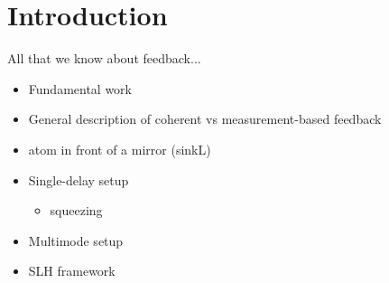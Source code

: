 \documentclass[%
 reprint,
 amsmath,amssymb,
pra,
]{revtex4-1}
\begin{document}

\section{Introduction}
All that we know about feedback...

\begin{itemize}
    \item Fundamental work \cite{Lloyd2000}
    \item General description of coherent vs measurement-based feedback \cite{Jacobs2014}
    \item atom in front of a mirror (sinkL) \cite{Eschner2001,Dorner2002, Beige2002,Tufarelli2014}
    \item Single-delay setup \cite{Wiseman1994}
    \begin{itemize}
        \item squeezing \cite{Gough2009,Iida2012,Kraft2016,Nemet2016}
    \end{itemize}
    \item Multimode setup \cite{Mabuchi2008}
    \item SLH framework \cite{Gough2008}
\end{itemize}

\clearpage
\end{document}
